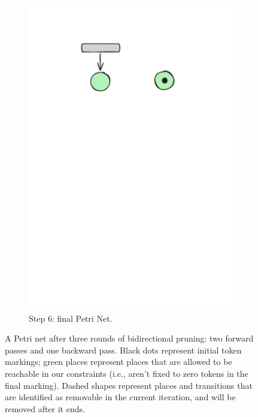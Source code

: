 \begin{figure}[h]
\begin{subfigure}[b][\subfigheight][b]{0.23\textwidth}
		\includegraphics[width=\textwidth]{plots/bidirectional_pruning_step_e_updated_2.pdf}
		\caption{Step 6: final Petri Net.}
		\label{fig:step:e}
	\end{subfigure}
	
	\caption{A Petri net after three rounds of bidirectional pruning: two forward passes and one backward pass. Black dots represent initial token markings; green places represent places that are allowed to be reachable in our constraints (i.e., aren't fixed to zero tokens in the final marking). Dashed shapes represent places and transitions that are identified as removable in the current iteration, and will be removed after it ends.}
	\label{fig:bidirectional_pruning}
\end{figure}


